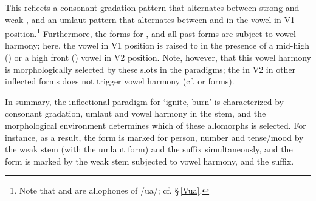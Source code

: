 This reflects a consonant gradation pattern that alternates between strong  and weak , and an umlaut pattern that alternates between  and  in the vowel in V1 position.\footnote{Note that  and  are allophones of /ua/; cf. §\,\ref{Vua}.} 
Furthermore, the forms for ,  and all past forms are subject to vowel harmony; here, the vowel in V1 position is raised to  in the presence of a mid-high () or a high front () vowel in V2 position. Note, however, that this vowel harmony is morphologically selected by these slots in the paradigms; the  in V2 in other inflected forms does not trigger vowel harmony (cf.  or  forms). 

In summary, the inflectional paradigm for  ‘ignite, burn’ is characterized by consonant gradation, umlaut and vowel harmony in the stem, and the morphological environment determines which of these allomorphs is selected. %
For instance, as a result, the  form  is marked for person, number and tense/mood by the weak  stem (with the  umlaut form) and the  suffix simultaneously, and the  form  is marked by the weak  stem subjected to vowel harmony, and the  suffix. 

